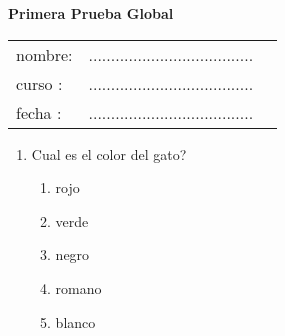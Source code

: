\documentclass[12pt,oneside,letterpaper]{article}
\begin{document}
	\begin{center}
	\Large\textbf{Primera Prueba Global}
	\end{center}
	\begin{tabular}{ l c r }
		nombre:  & .....................................\\
		curso :  & .....................................\\
		fecha :  & .....................................\\
	\end{tabular}
	\begin{enumerate}
		\item Cual es el color del gato?
		\begin{enumerate}
			\item rojo
			\item verde
			\item negro
			\item romano
			\item blanco
		\end{enumerate}
	\end{enumerate}
\end{document}
